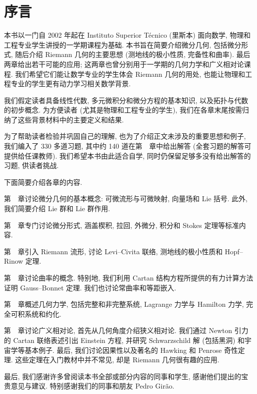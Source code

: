 \makeatletter
\let\RGPrefaceChapterHead\@makeschapterhead
\renewcommand{\@makeschapterhead}[1]{\phantomsection\RGPrefaceChapterHead{#1}}
\chapter*{序言}
\let\@makeschapterhead\RGPrefaceChapterHead
\makeatother
{}
\enlargethispage{\baselineskip}

本书以一门自 2002 年起在 Instituto Superior Técnico (里斯本) 面向数学, 物理和工程专业学生讲授的一学期课程为基础. 本书旨在简要介绍微分几何, 包括微分形式, 随后介绍 Riemann 几何的主要思想 (测地线的极小性质, 完备性和曲率). 最后两章给出若干可能的应用; 这两章也曾分别用于一学期的几何力学和广义相对论课程. 我们希望它们能让数学专业的学生体会 Riemann 几何的用处, 也能让物理和工程专业的学生更有动力学习相关数学背景.

我们假定读者具备线性代数, 多元微积分和微分方程的基本知识, 以及拓扑与代数的初步概念. 为方便读者 (尤其是物理和工程专业的学生), 我们在各章末尾按需归纳了这些背景材料中的主要定义和结果.

为了帮助读者检验并巩固自己的理解, 也为了介绍正文未涉及的重要思想和例子, 我们编入了 330 多道习题, 其中约 140 道在第~~章中给出解答 (全套习题的解答可提供给任课教师). 我们希望本书由此适合自学, 同时仍保留足够多没有给出解答的习题, 供读者挑战.

下面简要介绍各章的内容.

第~~章讨论微分几何的基本概念: 可微流形与可微映射, 向量场和 Lie 括号. 此外, 我们简要介绍 Lie 群和 Lie 群作用.

第~~章专门讨论微分形式, 涵盖楔积, 拉回, 外微分, 积分和 Stokes 定理等标准内容.

第~~章引入 Riemann 流形, 讨论 Levi–Civita 联络, 测地线的极小性质和 Hopf–Rinow 定理.

第~~章讨论曲率的概念. 特别地, 我们利用 Cartan 结构方程所提供的有力计算方法证明 Gauss–Bonnet 定理. 我们也讨论常曲率和等距嵌入.

第~~章概述几何力学, 包括完整和非完整系统, Lagrange 力学与 Hamilton 力学, 完全可积系统和约化.

第~~章讨论广义相对论, 首先从几何角度介绍狭义相对论. 我们通过 Newton 引力的 Cartan 联络表述引出 Einstein 方程, 并研究 Schwarzschild 解 (包括黑洞) 和宇宙学等基本例子. 最后, 我们讨论因果性以及著名的 Hawking 和 Penrose 奇性定理. 这些定理在入门教材中并不常见, 却是 Riemann 几何很有趣的应用.

最后, 我们感谢许多曾阅读本书全部或部分内容的同事和学生, 感谢他们提出的宝贵意见与建议. 特别感谢我们的同事和朋友 Pedro Girão.
